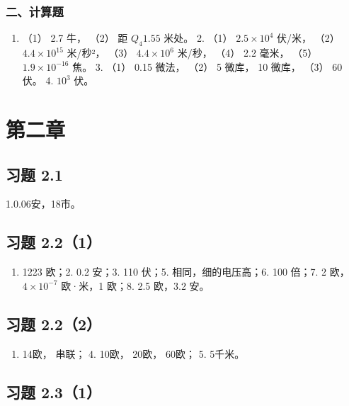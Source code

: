 \subsubsection{二、计算题}\label{ux4e8cux8ba1ux7b97ux9898-2}

\begin{enumerate}
\def\labelenumi{\arabic{enumi}.}
\tightlist
\item
  （1） 2.7 牛， （2） 距 \(Q_{4}1.55\) 米处。 2. （1）
  \(2.5 \times 10^{4}\) 伏/米， （2） \(4.4 \times 10^{15}\) 米/秒²，
  （3） \(4.4 \times 10^{6}\) 米/秒， （4） 2.2 毫米， （5）
  \(1.9 \times 10^{-16}\) 焦。 3. （1） 0.15 微法， （2） 5 微库， 10
  微库， （3） 60 伏。 4. \(10^{3}\) 伏。
\end{enumerate}

\section{第二章}\label{ux7b2cux4e8cux7ae0}

\subsection{习题 2.1}\label{ux4e60ux9898-2.1-1}

1.0.06安，18市。

\subsection{习题 2.2（1）}\label{ux4e60ux9898-2.21-1}

\begin{enumerate}
\def\labelenumi{\arabic{enumi}.}
\tightlist
\item
  1223 欧；2. 0.2 安；3. 110 伏；5. 相同，细的电压高；6. 100 倍；7. 2
  欧，\(4 \times 10^{-7}\) 欧·米，1 欧；8. 2.5 欧，3.2 安。
\end{enumerate}

\subsection{习题 2.2（2）}\label{ux4e60ux9898-2.22-1}

\begin{enumerate}
\def\labelenumi{\arabic{enumi}.}
\setcounter{enumi}{2}
\tightlist
\item
  14欧， 串联； 4. 10欧， 20欧， 60欧； 5. 5千米。
\end{enumerate}

\subsection{习题 2.3（1）}\label{ux4e60ux9898-2.31-1}

